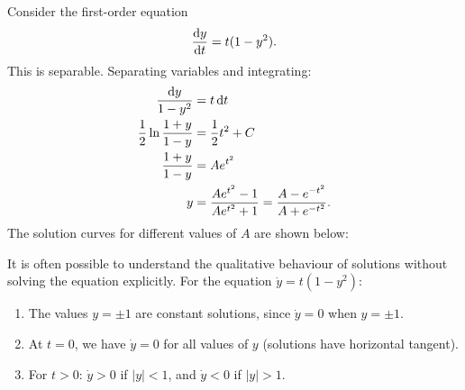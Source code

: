 \documentclass[a4paper]{article}
\begin{document}
\begin{eg}[Solution family for $\dot{y} = t(1-y^2)$]
  Consider the first-order equation
  \[
    \frac{\mathrm{d} y}{\mathrm{d} t} = t(1 - y^2).
  \]
  This is separable. Separating variables and integrating:
  \begin{align*}
    \frac{\mathrm{d} y}{1 - y^2} &= t\, \mathrm{d} t\\
    \frac{1}{2}\ln\frac{1 + y}{1 - y} &= \frac{1}{2}t^2 + C\\
    \frac{1 + y}{1 - y} &= Ae^{t^2}\\
    y &= \frac{Ae^{t^2} - 1}{Ae^{t^2} + 1} = \frac{A - e^{-t^2}}{A + e^{-t^2}}.
  \end{align*}
  The solution curves for different values of $A$ are shown below:
  \begin{center}
  \end{center}
\end{eg}

\begin{remark}
  It is often possible to understand the qualitative behaviour of solutions without solving the equation explicitly. For the equation $\dot{y} = t(1 - y^2)$:
  \begin{enumerate}
    \item The values $y = \pm 1$ are constant solutions, since $\dot{y} = 0$ when $y = \pm 1$.
    \item At $t = 0$, we have $\dot{y} = 0$ for all values of $y$ (solutions have horizontal tangent).
    \item For $t > 0$: $\dot{y} > 0$ if $|y| < 1$, and $\dot{y} < 0$ if $|y| > 1$.
  \end{enumerate}
\end{remark}
\end{document}

